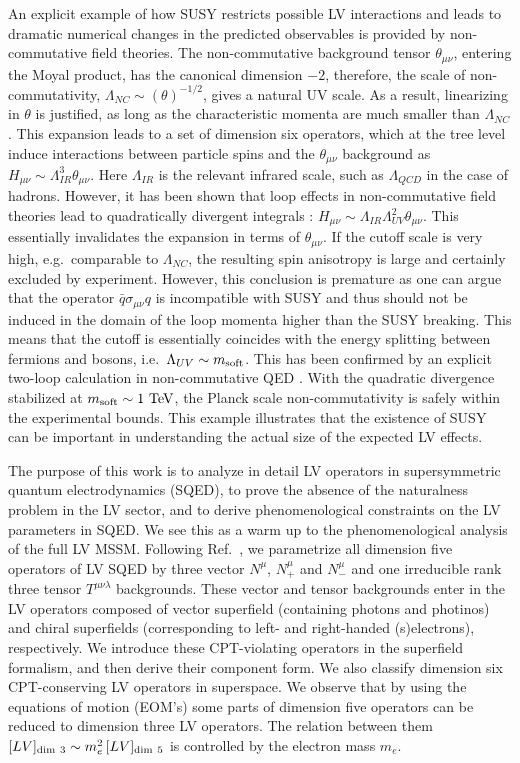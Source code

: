 \documentclass[12pt]{revtex4}
\begin{document}
An explicit example of how SUSY restricts possible LV interactions and
leads to dramatic numerical changes in the predicted observables is
provided by non-commutative field theories. The non-commutative
background tensor $\theta_{\mu\nu}$, entering the Moyal product, has
the canonical dimension $-2$, therefore, the scale of non-commutativity,
$\Lambda_{NC} \sim(\theta)^{-1/2}$, gives a natural UV scale. 
As a result, linearizing in $\theta$ is justified, as long as the
characteristic momenta are much smaller than $\Lambda_{NC}$. 
This expansion leads to a set of dimension six operators, which at the
tree level induce interactions between particle spins and the 
$\theta_{\mu\nu}$ background \cite{MPR1} as 
$H_{\mu\nu} \sim\Lambda_{IR}^3\theta_{\mu\nu}$. 
Here $ \Lambda_{IR}$ is the relevant infrared scale, such as 
$\Lambda_{QCD}$ in the case of hadrons. However, it has been shown
that loop effects in non-commutative field theories lead to
quadratically divergent integrals \cite{UCSC}: 
$H_{\mu\nu} \sim \Lambda_{IR}\Lambda_{UV}^2\theta_{\mu\nu}$. 
This essentially invalidates the expansion in terms of $\theta_{\mu\nu}$. 
If the cutoff scale is very high, e.g.\ comparable to $\Lambda_{NC}$, 
the resulting spin anisotropy is large and certainly excluded by
experiment. However, this conclusion is premature as  
one can argue that the operator $\bar q \sigma_{\mu\nu} q$ 
is incompatible with SUSY \cite{MPR2} and thus should not be induced 
in the domain of the loop momenta higher than the SUSY breaking. 
This means that the cutoff is essentially coincides with the 
energy splitting between fermions and bosons, i.e.\ 
$\Lambda_{UV} \sim m_{\rm soft}$. 
This has been confirmed by an explicit two-loop calculation in
non-commutative QED \cite{WMC2}. With the quadratic divergence
stabilized at $m_{\rm soft}\sim 1~{\rm TeV}$,
the Planck scale non-commutativity is safely within the experimental 
bounds. This example illustrates that the existence of SUSY can be
important in understanding the actual size of the expected LV effects. 


The purpose of this work is to analyze in detail LV operators in 
supersymmetric quantum electrodynamics (SQED), to prove 
the absence of the naturalness problem in the LV sector, and to derive
phenomenological  constraints on the LV parameters in SQED.  
We see this as a warm up to the phenomenological analysis of the full
LV MSSM.  Following Ref.\ \cite{GrootNibbelink:2004za}, we
parametrize all dimension five operators of LV SQED by three vector 
$N^{\mu}$, $N^{\mu}_+$ and $N^{\mu}_-$ and one irreducible 
rank three tensor $T^{\mu\nu\lambda}$ backgrounds. 
These vector and tensor backgrounds enter in the LV
operators composed  of vector superfield (containing photons and
photinos) and chiral superfields (corresponding to left- and
right-handed (s)electrons), respectively. 
We introduce these CPT-violating operators in the superfield
formalism, and then derive their component form. We also classify
dimension six CPT-conserving LV operators in superspace. 
We observe that by using the equations of
motion (EOM's) some parts of dimension five operators can be 
reduced to dimension three LV operators. The relation  
between them
$[LV]_{\rm dim~3} \sim m_e^2\, [LV]_{\rm dim~5}$ 
is controlled by the electron mass $m_e$. 
\end{document}
